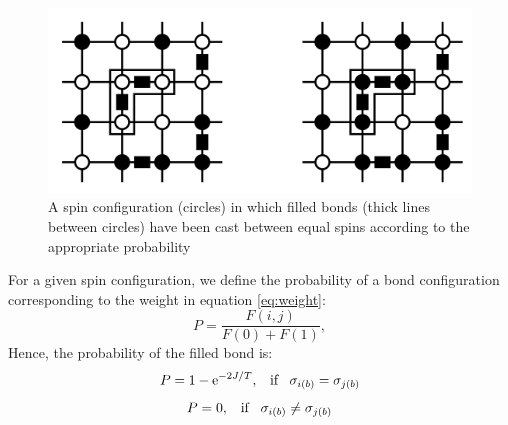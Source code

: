 \documentclass[a4paper,8pt]{article}
\begin{document}
\begin{figure}
    \centering
    \includegraphics[width=0.7\linewidth]{clusters_sw_theory.png}
    \caption{A spin configuration (circles) in which filled bonds (thick lines between circles) have
been cast between equal spins according to the appropriate probability}
    \label{fig:enter-label}
\end{figure}

For a given spin configuration, we define the probability of a bond configuration corresponding to the weight in equation \ref{eq:weight}:
\begin{equation}
    P = \frac{F(i,j)}{F(0) + F(1)}, 
\end{equation}
Hence, the probability of the filled bond is:
\begin{equation}
    P = 1 - \mathrm{e}^{-2J/T} , \hspace{0.3cm} \text{if} \hspace{0.3cm} \sigma_{i(b)} = \sigma_{j(b)}
\end{equation}
\begin{equation}
    P = 0 , \hspace{0.3cm} \text{if} \hspace{0.3cm} \sigma_{i(b)} \neq \sigma_{j(b)}
\end{equation}
\end{document}
